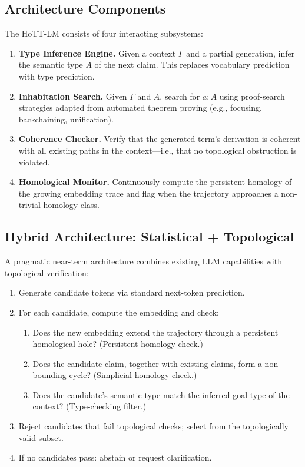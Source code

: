 \documentclass[11pt,a4paper,twocolumn]{article}
\theoremstyle{plain}
\theoremstyle{definition}
\begin{document}
\subsection{Architecture Components}

The HoTT-LM consists of four interacting subsystems:

\begin{enumerate}[leftmargin=*,nosep]
  \item \textbf{Type Inference Engine.} Given a context $\Gamma$ and a partial generation, infer the semantic type $A$ of the next claim. This replaces vocabulary prediction with type prediction.
  \item \textbf{Inhabitation Search.} Given $\Gamma$ and $A$, search for $a : A$ using proof-search strategies adapted from automated theorem proving (e.g., focusing, backchaining, unification).
  \item \textbf{Coherence Checker.} Verify that the generated term's derivation is coherent with all existing paths in the context---i.e., that no topological obstruction is violated.
  \item \textbf{Homological Monitor.} Continuously compute the persistent homology of the growing embedding trace and flag when the trajectory approaches a non-trivial homology class.
\end{enumerate}

\subsection{Hybrid Architecture: Statistical + Topological}

A pragmatic near-term architecture combines existing LLM capabilities with topological verification:

\begin{enumerate}[leftmargin=*,nosep]
  \item Generate candidate tokens via standard next-token prediction.
  \item For each candidate, compute the embedding and check:
  \begin{enumerate}[nosep]
    \item Does the new embedding extend the trajectory through a persistent homological hole? (Persistent homology check.)
    \item Does the candidate claim, together with existing claims, form a non-bounding cycle? (Simplicial homology check.)
    \item Does the candidate's semantic type match the inferred goal type of the context? (Type-checking filter.)
  \end{enumerate}
  \item Reject candidates that fail topological checks; select from the topologically valid subset.
  \item If no candidates pass: abstain or request clarification.
\end{enumerate}
\end{document}
